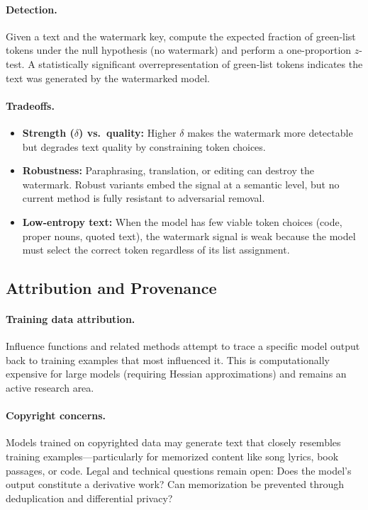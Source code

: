 \paragraph{Detection.}
Given a text and the watermark key, compute the expected fraction of green-list
tokens under the null hypothesis (no watermark) and perform a one-proportion
$z$-test.  A statistically significant overrepresentation of green-list tokens
indicates the text was generated by the watermarked model.

\paragraph{Tradeoffs.}
\begin{itemize}
    \item \textbf{Strength ($\delta$) vs.\ quality:} Higher $\delta$ makes
    the watermark more detectable but degrades text quality by constraining
    token choices.
    \item \textbf{Robustness:} Paraphrasing, translation, or editing can
    destroy the watermark.  Robust variants embed the signal at a semantic
    level, but no current method is fully resistant to adversarial removal.
    \item \textbf{Low-entropy text:} When the model has few viable token
    choices (code, proper nouns, quoted text), the watermark signal is
    weak because the model must select the correct token regardless of
    its list assignment.
\end{itemize}

\subsection{Attribution and Provenance}

\paragraph{Training data attribution.}
Influence functions and related methods attempt to trace a specific model output
back to training examples that most influenced it.  This is computationally
expensive for large models (requiring Hessian approximations) and remains an
active research area.

\paragraph{Copyright concerns.}
Models trained on copyrighted data may generate text that closely resembles
training examples---particularly for memorized content like song lyrics, book
passages, or code.  Legal and technical questions remain open: Does the model's
output constitute a derivative work?  Can memorization be prevented through
deduplication and differential privacy?

